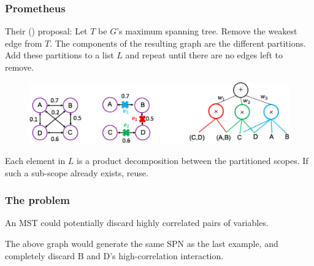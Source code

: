 \documentclass[usenames,dvipsnames]{beamer}
\begin{document}
\begin{frame}
  \frametitle{Prometheus}

  \begin{block}{Their (\cite{prometheus}) proposal:}
    Let $T$ be $G$'s maximum spanning tree. Remove the weakest edge from $T$. The components of the
    resulting graph are the different partitions. Add these partitions to a list $L$ and repeat
    until there are no edges left to remove.
  \end{block}

  \begin{figure}
    \centering\includegraphics[width=\textwidth]{imgs/mst_decomp.png}
  \end{figure}

  Each element in $L$ is a product decomposition between the partitioned scopes. If such a
  sub-scope already exists, reuse.
\end{frame}

\begin{frame}
  \frametitle{The problem}

  An MST could potentially discard highly correlated pairs of variables.

  \begin{figure}
    \centering
  \end{figure}

  The above graph would generate the same SPN as the last example, and completely discard B and D's
  high-correlation interaction.
\end{frame}
\end{document}
